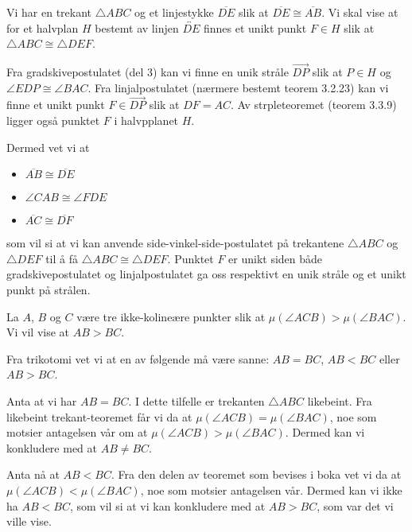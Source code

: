 \begin{oppgave}[4.2.5]
    Vi har en trekant $\triangle ABC$ og et linjestykke $\overline{DE}$ slik at $\overline{DE}\cong \overline{AB}$. 
    Vi skal vise at for et halvplan $H$ bestemt av linjen $\overleftrightarrow{DE}$ finnes et unikt punkt $F\in H$ slik at $\triangle ABC\cong \triangle DEF$.
    
    Fra gradskivepostulatet (del 3) kan vi finne en unik stråle $\overrightarrow{DP}$ slik at $P\in H$ og $\angle EDP\cong \angle BAC$.
    Fra linjalpostulatet (nærmere bestemt teorem 3.2.23) kan vi finne et unikt punkt $F\in \overrightarrow{DP}$ slik at $DF=AC$. 
    Av strpleteoremet (teorem 3.3.9) ligger også punktet $F$ i halvpplanet $H$.

    \begin{figure}[H]
        \centering
        
    \end{figure}
    
    Dermed vet vi at 
    \begin{itemize}
        \item $\overline{AB}\cong \overline{DE}$
        \item $\angle CAB\cong \angle FDE$
        \item $\overline{AC}\cong \overline{DF}$
    \end{itemize}
    som vil si at vi kan anvende side-vinkel-side-postulatet på trekantene $\triangle ABC$ og $\triangle DEF$ til å få $\triangle ABC\cong \triangle DEF$. 
    Punktet $F$ er unikt siden både gradskivepostulatet og linjalpostulatet ga oss respektivt en unik stråle og et unikt punkt på strålen. 
\end{oppgave}


\begin{oppgave}[4.3.1]
    La $A$, $B$ og $C$ være tre ikke-kolineære punkter slik at $\mu(\angle ACB)>\mu(\angle BAC)$. 
    Vi vil vise at $AB>BC$.

    Fra trikotomi vet vi at en av følgende må være sanne: $AB=BC$, $AB<BC$ eller $AB>BC$. 

    Anta at vi har $AB=BC$. I dette tilfelle er trekanten $\triangle ABC$ likebeint. 
    Fra likebeint trekant-teoremet får vi da at $\mu(\angle ACB)=\mu(\angle BAC)$, noe som motsier antagelsen vår om at $\mu(\angle ACB)>\mu(\angle BAC)$.
    Dermed kan vi konkludere med at $AB\neq BC$. 

    Anta nå at $AB<BC$. 
    Fra den delen av teoremet som bevises i boka vet vi da at $\mu(\angle ACB)<\mu(\angle BAC)$, noe som motsier antagelsen vår. 
    Dermed kan vi ikke ha $AB<BC$, som vil si at vi kan konkludere med at $AB>BC$, som var det vi ville vise. 
\end{oppgave}


